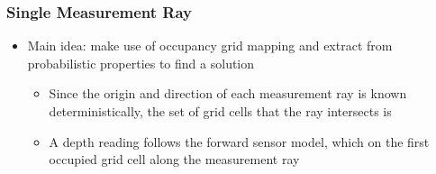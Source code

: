 \documentclass[11pt,professionalfonts,hyperref={pdftex,pdfpagemode=none,pdfstartview=FitH}]{beamer}
\renewcommand{\emph}[1]{\textit{\textbf{\color{blue}{#1}}}}
\begin{document}
\begin{frame}
\frametitle{Single Measurement Ray}

\begin{itemize}
    \item Main idea: make use of occupancy grid mapping \emph{assumptions} and extract \emph{patterns} from probabilistic properties to find a \emph{computationally-efficient} solution
	\begin{itemize}
		\item Since the origin and direction of each measurement ray is known deterministically, the set of grid cells that the ray intersects is \emph{known through geometry}
		\item A depth reading follows the forward sensor model, which \emph{only depends} on the first occupied grid cell along the measurement ray
	\end{itemize}
\end{itemize}
\setcounter{subfigure}{0}
\begin{figure}[!htbp]
\vspace*{-0.25cm}
\centerline{
 }
\end{figure}
\end{frame}
\end{document}
